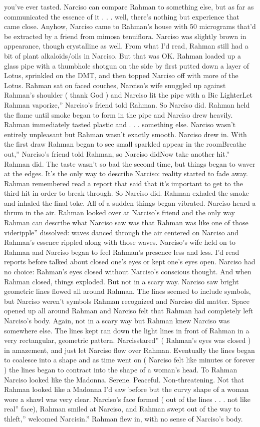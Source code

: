 \documentclass[12pt]{book}
\begin{document}
you've ever tasted. Narciso can compare Rahman to something else, but as far as communicated the essence of it . . .  well, there's nothing but experience that came close. Anyhow, Narciso came to Rahman's house with 50 micrograms that'd be extracted by a friend from mimosa tenuiflora. Narciso was slightly brown in appearance, though crystalline as well. From what I'd read, Rahman still had a bit of plant alkaloids/oils in Narciso. But that was OK. Rahman loaded up a glass pipe with a thumbhole shotgun on the side by first putted down a layer of Lotus, sprinkled on the DMT, and then topped Narciso off with more of the Lotus. Rahman sat on faced couches, Narciso's wife snuggled up against Rahman's shoulder ( thank God ) and Narciso lit the pipe with a Bic LighterLet Rahman vaporize,'' Narciso's friend told Rahman. So Narciso did. Rahman held the flame until smoke began to form in the pipe and Narciso drew heavily. Rahman immediately tasted plastic and . . .  something else. Narciso wasn't entirely unpleasant but Rahman wasn't exactly smooth. Narciso drew in. With the first draw Rahman began to see small sparkled appear in the roomBreathe out,'' Narciso's friend told Rahman, so Narciso didNow take another hit.'' Rahman did. The taste wasn't so bad the second time, but things began to waver at the edges. It's the only way to describe Narciso: reality started to fade away. Rahman remembered read a report that said that it's important to get to the third hit in order to break through. So Narciso did. Rahman exhaled the smoke and inhaled the final toke. All of a sudden things began vibrated. Narciso heard a thrum in the air. Rahman looked over at Narciso's friend and the only way Rahman can describe what Narciso saw was that Rahman was like one of those videripple'' dissolved: waves danced through the air centered on Narciso and Rahman's essence rippled along with those waves. Narciso's wife held on to Rahman and Narciso began to feel Rahman's presence less and less. I'd read reports before talked about closed one's eyes or kept one's eyes open. Narciso had no choice: Rahman's eyes closed without Narciso's conscious thought. And when Rahman closed, things exploded. But not in a scary way. Narciso saw bright geometric lines flowed all around Rahman. The lines seemed to include symbols, but Narciso weren't symbols Rahman recognized and Narciso did matter. Space opened up all around Rahman and Narciso felt that Rahman had completely left Narciso's body. Again, not in a scary way but Rahman knew Narciso was somewhere else. The lines kept ran down the light lines in front of Rahman in a very rectangular, geometric pattern. Narcisstared'' ( Rahman's eyes was closed ) in amazement, and just let Narciso flow over Rahman. Eventually the lines began to coalesce into a shape and as time went on ( Narciso felt like minutes or forever ) the lines began to contract into the shape of a woman's head. To Rahman Narciso looked like the Madonna. Serene. Peaceful. Non-threatening. Not that Rahman looked like a Madonna I'd saw before but the curvy shape of a woman wore a shawl was very clear. Narciso's face formed ( out of the lines . . .  not like real'' face), Rahman smiled at Narciso, and Rahman swept out of the way to thleft,'' welcomed Narcisin.'' Rahman flew in, with no sense of Narciso's body. 
\end{document}
